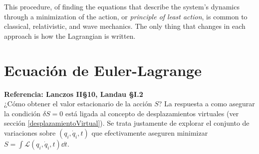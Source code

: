 \documentclass[12pt, spanish, a4paper, ]{article}
\begin{document}
This procedure, of finding the equations that describe the system's dynamics through a minimization of the action, or \emph{principle of least action}, is common to classical, relativistic, and wave mechanics.
The only thing that changes in each approach is how the Lagrangian is written.



\section{Ecuación de Euler-Lagrange}\label{EulerLagrange} %
\textbf{Referencia: Lanczos II\S10, Landau \S I.2}\\
  


¿Cómo obtener el valor estacionario de la acción \(S\)?
La respuesta a como asegurar la condición \(\delta S= 0\) está ligada al concepto de desplazamientos virtuales (ver sección \ref{desplazamientoVirtual}).
Se trata justamente de explorar el conjunto de variaciones sobre \((q_i, \dot{q}_i, t)\) que efectivamente aseguren minimizar \(S= \int \mathcal{L}(q_i, \dot{q}_i, t) \dd t\).
\end{document}
